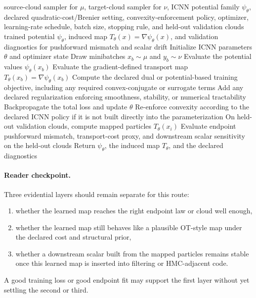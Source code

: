 \begin{algorithm}[ht]
\caption{\texttt{train\_icnn\_brenier\_map}}
\begin{algorithmic}[1]
\Require source-cloud sampler for \(\mu\), target-cloud sampler for \(\nu\), ICNN potential family \(\psi_\theta\), declared quadratic-cost/Brenier setting, convexity-enforcement policy, optimizer, learning-rate schedule, batch size, stopping rule, and held-out validation clouds
\Ensure trained potential \(\psi_\theta\), induced map \(T_\theta(x)=\nabla\psi_\theta(x)\), and validation diagnostics for pushforward mismatch and scalar drift
\State Initialize ICNN parameters \(\theta\) and optimizer state
  \State Draw minibatches \(x_b\sim\mu\) and \(y_b\sim\nu\)
  \State Evaluate the potential values \(\psi_\theta(x_b)\)
  \State Evaluate the gradient-defined transport map \(T_\theta(x_b)=\nabla\psi_\theta(x_b)\)
  \State Compute the declared dual or potential-based training objective, including any required convex-conjugate or surrogate terms
  \State Add any declared regularization enforcing smoothness, stability, or numerical tractability
  \State Backpropagate the total loss and update \(\theta\)
  \State Re-enforce convexity according to the declared ICNN policy if it is not built directly into the parameterization
\EndWhile
  \State On held-out validation clouds, compute mapped particles \(T_\theta(x_i)\)
  \State Evaluate endpoint pushforward mismatch, transport-cost proxy, and downstream scalar sensitivity on the held-out clouds
  \State Return \(\psi_\theta\), the induced map \(T_\theta\), and the declared diagnostics
\end{algorithmic}
\end{algorithm}

\paragraph{Reader checkpoint.}
Three evidential layers should remain separate for this route:
\begin{enumerate}[label=(\roman*)]
  \item whether the learned map reaches the right endpoint law or cloud well enough,
  \item whether the learned map still behaves like a plausible OT-style map under
    the declared cost and structural prior,
  \item whether a downstream scalar built from the mapped particles remains stable
    once this learned map is inserted into filtering or HMC-adjacent code.
\end{enumerate}
A good training loss or good endpoint fit may support the first layer without yet
settling the second or third.

